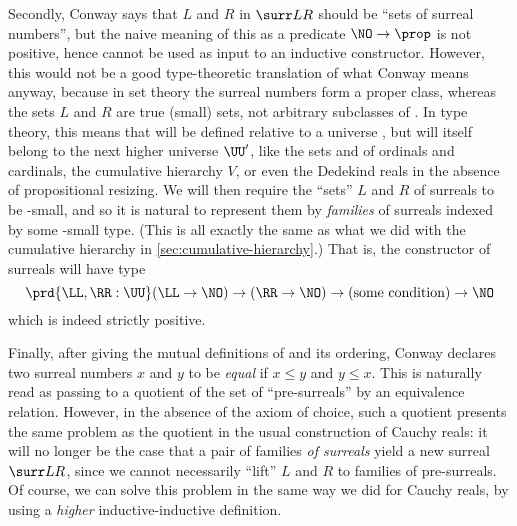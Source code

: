 Secondly, Conway says that $L$ and $R$ in $\surr L R$ should be ``sets of surreal numbers'', but the naive meaning of this as a predicate $\NO\to\prop$ is not positive, hence cannot be used as input to an inductive constructor.
However, this would not be a good type-theoretic translation of what Conway means anyway, because in set theory the surreal numbers form a proper class, whereas the sets $L$ and $R$ are true (small) sets, not arbitrary subclasses of \NO.
In type theory, this means that \NO will be defined relative to a universe \UU, but will itself belong to the next higher universe $\UU'$, like the sets \ord and \card of ordinals and cardinals, the cumulative hierarchy $V$, or even the Dedekind reals in the absence of propositional resizing.
%
We will then require the ``sets'' $L$ and $R$ of surreals to be \UU-small, and so it is natural to represent them by \emph{families} of surreals indexed by some \UU-small type.
(This is all exactly the same as what we did with the cumulative hierarchy in \cref{sec:cumulative-hierarchy}.)
That is, the constructor of surreals will have type
\[ \prd{\LL,\RR:\UU} (\LL\to\NO) \to (\RR\to \NO) \to (\text{some condition}) \to \NO \]
which is indeed strictly positive.

Finally, after giving the mutual definitions of \NO and its ordering, Conway declares two surreal numbers $x$ and $y$ to be \emph{equal} if $x\le y$ and $y\le x$.
This is naturally read as passing to a quotient of the set of ``pre-surreals'' by an equivalence relation.
However, in the absence of the axiom of choice, such a quotient presents the same problem as the quotient in the usual construction of Cauchy reals: it will no longer be the case that a pair of families \emph{of surreals} yield a new surreal $\surr L R$, since we cannot necessarily ``lift'' $L$ and $R$ to families of pre-surreals.
Of course, we can solve this problem in the same way we did for Cauchy reals, by using a \emph{higher} inductive-inductive definition.

